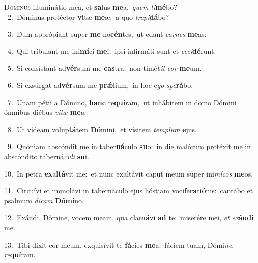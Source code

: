 \lettrine{\initial\textcolor{\initialcolor}{D}}{óminus} illuminátio mea, et \textbf{sa}\-lus \textbf{me}\-a,~\star \textit{quem} \textit{ti}\-\textbf{mé}bo?\\
{\numbfont\textcolor{\numbcolor}{~2.}}~Dóminus protéctor \textbf{vi}\-tæ \textbf{me}\-æ,~\star a quo \textit{tre}\-\textit{pi}\textbf{dá}bo?\par
{\numbfont\textcolor{\numbcolor}{~3.}}~Dum apprópiant super \textbf{me} no\-\textbf{cén}\-tes,~\star ut edant \textit{car}\-\textit{nes} \textbf{me}\-as:\par
{\numbfont\textcolor{\numbcolor}{~4.}}~Qui tríbulant me ini\-\textbf{mí}\-ci \textbf{me}\-i,~\star ipsi infirmáti sunt et \textit{ce}\-\textit{ci}\textbf{dé}runt.\par
{\numbfont\textcolor{\numbcolor}{~5.}}~Si consístant ad\-\textbf{vér}\-sum me \textbf{cas}\-tra,~\star non timé\textit{bit} \textit{cor} \textbf{me}\-um.\par
{\numbfont\textcolor{\numbcolor}{~6.}}~Si exsúrgat ad\-\textbf{vér}\-sum me \textbf{prǽ}\-lium,~\star in hoc e\textit{go} \textit{spe}\-\textbf{rá}bo.\par
{\numbfont\textcolor{\numbcolor}{~7.}}~Unam pétii a Dómino, \textbf{hanc} re\-\textbf{quí}\-ram,~\star ut inhábitem in domo Dómini ómnibus diébus \textit{vi}\-\textit{tæ} \textbf{me}\-æ:\par
{\numbfont\textcolor{\numbcolor}{~8.}}~Ut vídeam volup\-\textbf{tá}\-tem \textbf{Dó}\-mini,~\star et vísitem \textit{tem}\-\textit{plum} \textbf{e}\-jus.\par
{\numbfont\textcolor{\numbcolor}{~9.}}~Quóniam abscóndit me in taber\-\textbf{ná}\-culo \textbf{su}\-o:~\star in die malórum protéxit me in abscóndito taberná\-\textit{cu}\-\textit{li} \textbf{su}\-i.\par
{\numbfont\textcolor{\numbcolor}{10.}}~In petra \textbf{ex}\-al\-\textbf{tá}\-vit me:~\star et nunc exaltávit caput meum super ini\-\textit{mí}\-\textit{cos} \textbf{me}\-os.\par
{\numbfont\textcolor{\numbcolor}{11.}}~Circuívi et immolávi in tabernáculo ejus hóstiam vocife\-\textbf{ra}\-ti\-\textbf{ó}\-nis:~\star cantábo et psalmum \textit{di}\-\textit{cam} \textbf{Dó}\-\textbf{mi}no.\par
{\numbfont\textcolor{\numbcolor}{12.}}~Exáudi, Dómine, vocem meam, qua cla\-\textbf{má}\-vi \textbf{ad} te:~\star miserére mei, \textit{et} \textit{ex}\-\textbf{áu}\textbf{di} me.\par
{\numbfont\textcolor{\numbcolor}{13.}}~Tibi dixit cor meum, exquisívit te \textbf{fá}\-cies \textbf{me}\-a:~\star fáciem tuam, Dómi\-\textit{ne}\-, \textit{re}\-\textbf{quí}ram.\par
